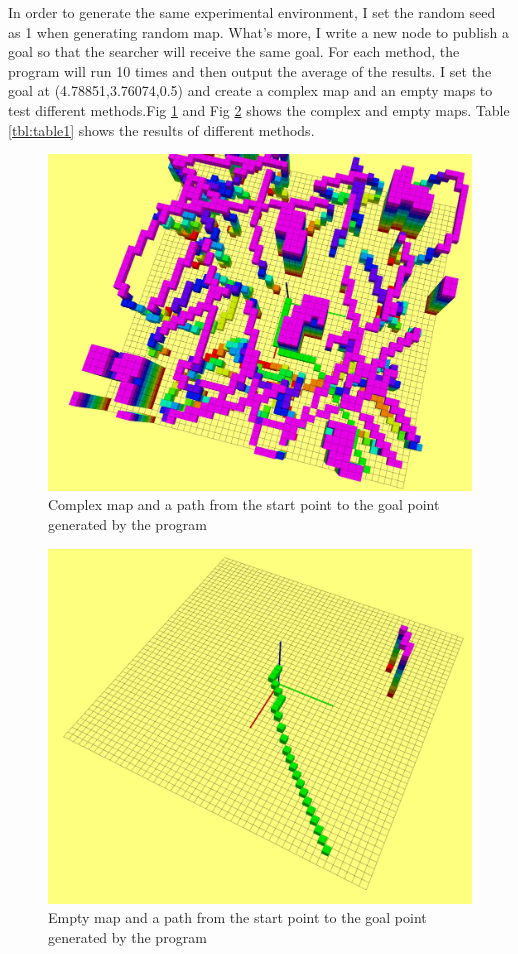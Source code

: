 \documentclass[conference]{IEEEtran}
\begin{document}
In order to generate the same experimental environment, I set the random seed as 1 when generating random map. What's more, I write a new node to publish a goal so that the searcher will receive the same goal. For each method, the program will run 10 times and then output the average of the results. I set the goal at (4.78851,3.76074,0.5) and create a complex map and an empty maps to test different methods.Fig \ref{fig:label4_1} and Fig \ref{fig:label4_2} shows the complex and empty maps. Table \ref {tbl:table1} shows the results of different methods. 

\begin{figure}[htbp]
	\centering
	\includegraphics[scale=0.2]{figs/fig4_1.png}
	\caption{Complex map and a path from the start point to the goal point generated by the program}
	\label{fig:label4_1}
\end{figure}

\begin{figure}[htbp]
	\centering
	\includegraphics[scale=0.2]{figs/fig4_2.png}
	\caption{Empty map and a path from the start point to the goal point generated by the program}
	\label{fig:label4_2}
\end{figure}
\end{document}
